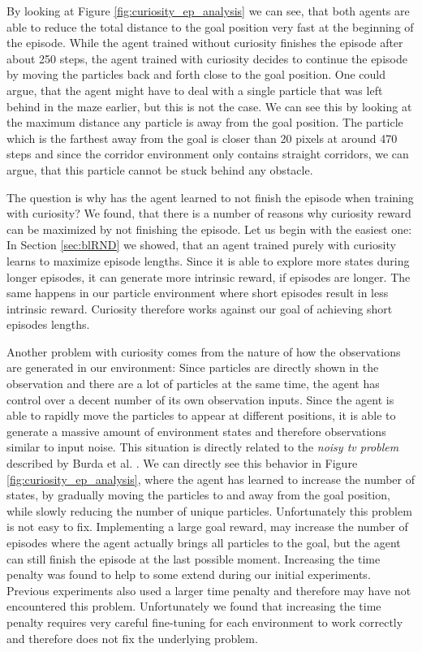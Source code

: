 By looking at Figure \ref{fig:curiosity_ep_analysis} we can see, that both agents are able to reduce the total distance to the goal position very fast at the beginning of the episode. While the agent trained without curiosity finishes the episode after about 250 steps, the agent trained with curiosity decides to continue the episode by moving the particles back and forth close to the goal position. One could argue, that the agent might have to deal with a single particle that was left behind in the maze earlier, but this is not the case. We can see this by looking at the maximum distance any particle is away from the goal position. The particle which is the farthest away from the goal is closer than 20 pixels at around 470 steps and since the corridor environment only contains straight corridors, we can argue, that this particle cannot be stuck behind any obstacle. 

The question is why has the agent learned to not finish the episode when training with curiosity? We found, that there is a number of reasons why curiosity reward can be maximized by not finishing the episode. Let us begin with the easiest one: In Section \ref{sec:blRND} we showed, that an agent trained purely with curiosity learns to maximize episode lengths. Since it is able to explore more states during longer episodes, it can generate more intrinsic reward, if episodes are longer. The same happens in our particle environment where short episodes result in less intrinsic reward. Curiosity therefore works against our goal of achieving short episodes lengths. 

Another problem with curiosity comes from the nature of how the observations are generated in our environment: Since particles are directly shown in the observation and there are a lot of particles at the same time, the agent has control over a decent number of its own observation inputs. Since the agent is able to rapidly move the particles to appear at different positions, it is able to generate a massive amount of environment states and therefore observations similar to input noise. This situation is directly related to the \textit{noisy tv problem} described by Burda et al. \cite{burda2018large}. We can directly see this behavior in Figure \ref{fig:curiosity_ep_analysis}, where the agent has learned to increase the number of states, by gradually moving the particles to and away from the goal position, while slowly reducing the number of unique particles. Unfortunately this problem is not easy to fix. Implementing a large goal reward, may increase the number of episodes where the agent actually brings all particles to the goal, but the agent can still finish the episode at the last possible moment. Increasing the time penalty was found to help to some extend during our initial experiments. Previous experiments \cite{huang2019,becker2020} also used a larger time penalty and therefore may have not encountered this problem. Unfortunately we found that increasing the time penalty requires very careful fine-tuning for each environment to work correctly and therefore does not fix the underlying problem.

